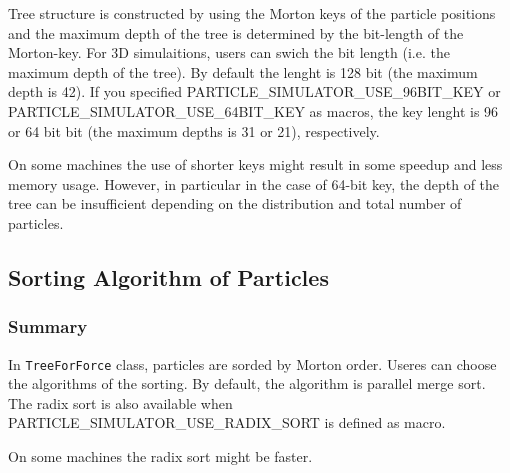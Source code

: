 Tree structure is constructed by using the Morton keys of the particle
positions and the maximum depth of the tree is determined by the
bit-length of the Morton-key. For 3D simulaitions, users can swich the
bit length (i.e. the maximum depth of the tree). By default the lenght
is 128 bit (the maximum depth is 42). If you specified
PARTICLE\_SIMULATOR\_USE\_96BIT\_KEY or
PARTICLE\_SIMULATOR\_USE\_64BIT\_KEY as macros, the key lenght is 96 or 64 bit
bit (the maximum depths is 31 or 21), respectively.



On some machines the use of shorter keys might result in some speedup
and less memory usage. However, in particular in the case of 64-bit
key, the depth of the tree can be insufficient depending on the
distribution and total number of particles.



\subsection{Sorting Algorithm of Particles}
\label{sec:compile_sort_method}
\subsubsection{Summary}


In {\tt TreeForForce} class, particles are sorded by Morton
order. Useres can choose the algorithms of the sorting. By default,
the algorithm is parallel merge sort. The radix sort is also available
when PARTICLE\_SIMULATOR\_USE\_RADIX\_SORT is defined as macro.


On some machines the radix sort might be faster.

